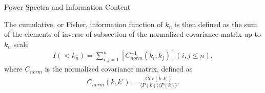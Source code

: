 \begin{section}{Power Spectra and Information Content}
\begin{figure}[t!]
\end{figure}
    The cumulative, or Fisher, information function of $k_n$ is then defined as the sum of the elements of inverse of subsection of the normalized covariance matrix up to $k_n$ scale
\begin{align}
    I \left( < k_n\right) = \sum_{i,j=1}^n \left[ C^{-1}_{norm} \left( k_i,k_j \right)\right] \left( i,j \leq n \right),
\end{align}
where $C_{norm}$ is the normalized covariance matrix, defined as
\begin{align}
    C_{norm} \left( k,k' \right)=\frac{\mathrm{Cov}(k,k')}{\langle P(k)\rangle\langle P(k)\rangle}.
\end{align}
  

\end{section}
